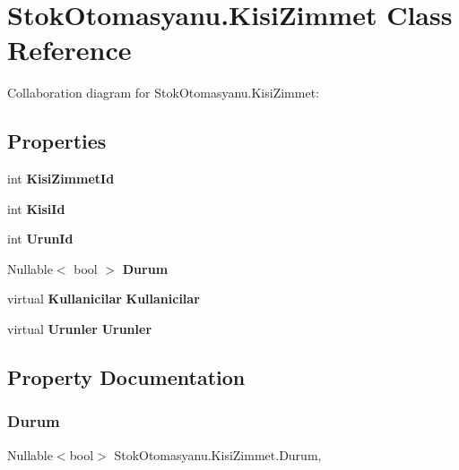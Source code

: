 \section{Stok\+Otomasyanu.\+Kisi\+Zimmet Class Reference}
\label{class_stok_otomasyanu_1_1_kisi_zimmet}


Collaboration diagram for Stok\+Otomasyanu.\+Kisi\+Zimmet\+:
\subsection*{Properties}
\begin{DoxyCompactItemize}
\item 
int \textbf{ Kisi\+Zimmet\+Id}\hspace{0.3cm}{\ttfamily  [get, set]}
\item 
int \textbf{ Kisi\+Id}\hspace{0.3cm}{\ttfamily  [get, set]}
\item 
int \textbf{ Urun\+Id}\hspace{0.3cm}{\ttfamily  [get, set]}
\item 
Nullable$<$ bool $>$ \textbf{ Durum}\hspace{0.3cm}{\ttfamily  [get, set]}
\item 
virtual \textbf{ Kullanicilar} \textbf{ Kullanicilar}\hspace{0.3cm}{\ttfamily  [get, set]}
\item 
virtual \textbf{ Urunler} \textbf{ Urunler}\hspace{0.3cm}{\ttfamily  [get, set]}
\end{DoxyCompactItemize}


\subsection{Property Documentation}
\mbox{\label{class_stok_otomasyanu_1_1_kisi_zimmet_a9a6b2b241a790e921f1dfa62ef8a4239}} 
\subsubsection{Durum}
{\footnotesize\ttfamily Nullable$<$bool$>$ Stok\+Otomasyanu.\+Kisi\+Zimmet.\+Durum\hspace{0.3cm}{\ttfamily [get]}, {\ttfamily [set]}}

